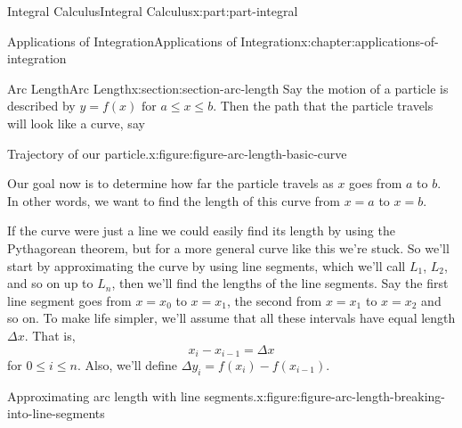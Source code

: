 \documentclass[twoside,10pt,]{tufte-book}
\numberwithin{equation}{part}
\begin{document}
\begin{partptx}{Integral Calculus}{}{Integral Calculus}{}{}{x:part:part-integral}
\begin{chapterptx}{Applications of Integration}{}{Applications of Integration}{}{}{x:chapter:applications-of-integration}
\typeout{************************************************}
%
\begin{sectionptx}{Arc Length}{}{Arc Length}{}{}{x:section:section-arc-length}
Say the motion of a particle is described by \(y = f(x) \text{ for } a \leq x \leq b.\) Then the path that the particle travels will look like a curve, say \begin{figureptx}{Trajectory of our particle.}{x:figure:figure-arc-length-basic-curve}{}%
\begin{image}{0}{1}{0}%
%
\end{image}%
\tcblower
\end{figureptx}%
%
\par
Our goal now is to determine how far the particle travels as \(x\) goes from \(a\) to \(b\). In other words, we want to find the length of this curve from \(x=a\) to \(x=b\).%
\par
If the curve were just a line we could easily find its length by using the Pythagorean theorem, but for a more general curve like this we're stuck. So we'll start by approximating the curve by using line segments, which we'll call \(L_1\), \(L_2\), and so on up to \(L_{n}\), then we'll find the lengths of the line segments. Say the first line segment goes from \(x=x_0\) to \(x=x_1\), the second from \(x=x_1\) to \(x=x_2\) and so on. To make life simpler, we'll assume that all these intervals have equal length \(\Delta x\). That is,%
\begin{equation*}
x_{i} - x_{i-1}  = \Delta x
\end{equation*}
for \(0 \leq i\leq n\). Also, we'll define \(\Delta y_{i} = f(x_{i}) - f(x_{i-1})\).%
\begin{figureptx}{Approximating arc length with line segments.}{x:figure:figure-arc-length-breaking-into-line-segments}{}%
\begin{image}{0}{1}{0}%
\end{image}
\end{figureptx}
\end{sectionptx}
\end{chapterptx}
\end{partptx}
\end{document}
